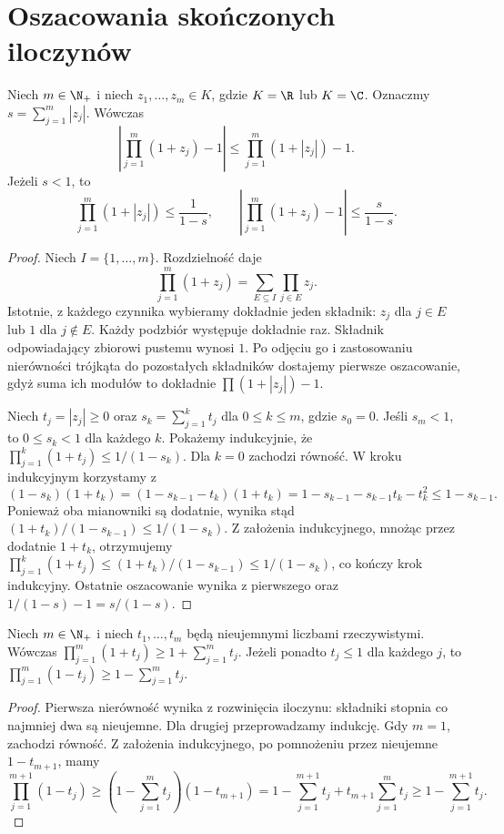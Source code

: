 \section{Oszacowania skończonych iloczynów}
\begin{lemat}
\label{ma1:lem:product-finite-estimate}
Niech $m\in\N_+$ i niech $z_1,\ldots,z_m\in K$, gdzie $K=\R$ lub $K=\C$. Oznaczmy $s=\sum_{j=1}^m|z_j|$. Wówczas
\[
 \left|\prod_{j=1}^m(1+z_j)-1\right|
 \le \prod_{j=1}^m(1+|z_j|)-1.
\]
Jeżeli $s<1$, to
\[
 \prod_{j=1}^m(1+|z_j|)\le\frac1{1-s},
 \qquad
 \left|\prod_{j=1}^m(1+z_j)-1\right|
 \le\frac{s}{1-s}.
\]
\end{lemat}
\begin{proof}
Niech $I=\{1,\ldots,m\}$. Rozdzielność daje
\[
 \prod_{j=1}^m(1+z_j)=\sum_{E\subseteq I}\prod_{j\in E}z_j.
\]
Istotnie, z każdego czynnika wybieramy dokładnie jeden składnik: $z_j$ dla $j\in E$ lub $1$ dla $j\notin E$. Każdy podzbiór występuje dokładnie raz. Składnik odpowiadający zbiorowi pustemu wynosi $1$. Po odjęciu go i zastosowaniu nierówności trójkąta do pozostałych składników dostajemy pierwsze oszacowanie, gdyż suma ich modułów to dokładnie $\prod(1+|z_j|)-1$.

Niech $t_j=|z_j|\ge0$ oraz $s_k=\sum_{j=1}^k t_j$ dla $0\le k\le m$, gdzie $s_0=0$. Jeśli $s_m<1$, to $0\le s_k<1$ dla każdego $k$. Pokażemy indukcyjnie, że $\prod_{j=1}^k(1+t_j)\le1/(1-s_k)$. Dla $k=0$ zachodzi równość. W kroku indukcyjnym korzystamy z
\[
 (1-s_k)(1+t_k)
 =(1-s_{k-1}-t_k)(1+t_k)
 =1-s_{k-1}-s_{k-1}t_k-t_k^2
 \le1-s_{k-1}.
\]
Ponieważ oba mianowniki są dodatnie, wynika stąd $(1+t_k)/(1-s_{k-1})\le1/(1-s_k)$. Z założenia indukcyjnego, mnożąc przez dodatnie $1+t_k$, otrzymujemy
$\prod_{j=1}^k(1+t_j)\le(1+t_k)/(1-s_{k-1})\le1/(1-s_k)$, co kończy krok indukcyjny. Ostatnie oszacowanie wynika z pierwszego oraz $1/(1-s)-1=s/(1-s)$.
\end{proof}

\begin{lemat}
\label{ma1:lem:positive-product-bound}
Niech $m\in\N_+$ i niech $t_1,\ldots,t_m$ będą nieujemnymi liczbami rzeczywistymi. Wówczas
$\prod_{j=1}^m(1+t_j)\ge1+\sum_{j=1}^m t_j$.
Jeżeli ponadto $t_j\le1$ dla każdego $j$, to
$\prod_{j=1}^m(1-t_j)\ge1-\sum_{j=1}^m t_j$.
\end{lemat}
\begin{proof}
Pierwsza nierówność wynika z rozwinięcia iloczynu: składniki stopnia co najmniej dwa są nieujemne. Dla drugiej przeprowadzamy indukcję. Gdy $m=1$, zachodzi równość. Z założenia indukcyjnego, po pomnożeniu przez nieujemne $1-t_{m+1}$, mamy
\[
 \prod_{j=1}^{m+1}(1-t_j)
 \ge (1-\sum_{j=1}^m t_j)(1-t_{m+1})
 =1-\sum_{j=1}^{m+1}t_j+t_{m+1}\sum_{j=1}^m t_j
 \ge1-\sum_{j=1}^{m+1}t_j.
\]
\end{proof}

